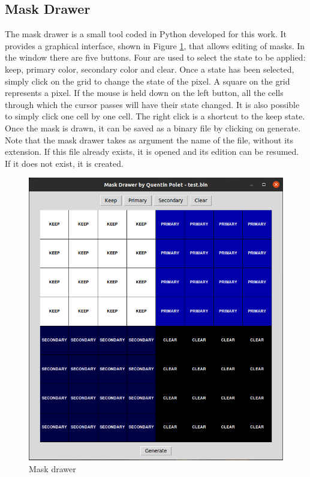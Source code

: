 \subsection{Mask Drawer}

The mask drawer is a small tool coded in Python developed for this work. It provides a graphical 
interface, shown in Figure \ref{fig:tools/mask_drawer}, that allows editing of masks. In the window 
there are five buttons. 
Four are used to select the state to be applied: keep, primary color, secondary color and clear. 
Once a state has been selected, simply click on the grid to change the state of the pixel. A square 
on the grid represents a pixel. If the mouse is held down on the left button, all the cells through 
which the cursor passes will have their state changed. It is also possible to simply click one cell 
by one cell. The right click is a shortcut to the keep state. Once the mask is drawn, it can be 
saved as a binary file by clicking on generate. Note that the mask drawer takes as argument the 
name of the file, without its extension. If this file already exists, it is opened and its edition 
can be resumed. If it does not exist, it is created. 

\begin{figure}[H]
    \centering
    \includegraphics[scale=0.5]{Chapter7-Tools-Demos/res/mask_drawer.png}
    \caption{Mask drawer}
    \label{fig:tools/mask_drawer}
\end{figure}

